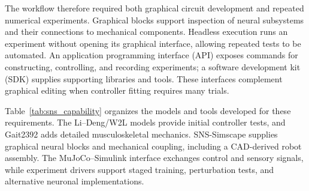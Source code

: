 The workflow therefore required both graphical circuit development and repeated numerical experiments. Graphical blocks support inspection of neural subsystems and their connections to mechanical components. Headless execution runs an experiment without opening its graphical interface, allowing repeated tests to be automated. An application programming interface (API) exposes commands for constructing, controlling, and recording experiments; a software development kit (SDK) supplies supporting libraries and tools. These interfaces complement graphical editing when controller fitting requires many trials.

Table~\ref{tab:sns_capability} organizes the models and tools developed for these requirements. The Li--Deng/W2L models provide initial controller tests, and Gait2392 adds detailed musculoskeletal mechanics. SNS-Simscape supplies graphical neural blocks and mechanical coupling, including a CAD-derived robot assembly. The MuJoCo--Simulink interface exchanges control and sensory signals, while experiment drivers support staged training, perturbation tests, and alternative neuronal implementations.

